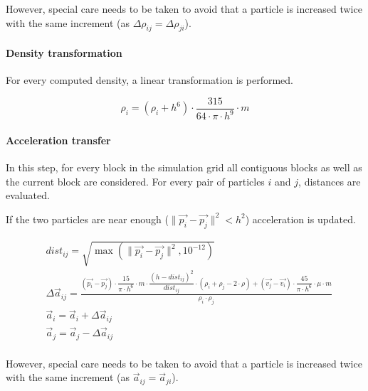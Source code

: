 However, special care needs to be taken to avoid that a particle is increased twice
with the same increment (as $\Delta \rho_{ij} = \Delta \rho_{ji}$).


\paragraph{Density transformation}
For every computed density, a linear transformation is performed.

\[
\rho_i = (\rho_i + h^6) \cdot \frac{315}{64 \cdot \pi \cdot h^9} \cdot m
\]

\paragraph{Acceleration transfer}
In this step, for every block in the simulation grid all contiguous blocks as
well as the current block are considered. For every pair of particles $i$ and
$j$, distances are evaluated.

If the two particles are near enough
($\|\vec{p_i} - \vec{p_j}\|^2 < h^2$) 
acceleration is updated.

\[
\begin{split}
& dist_{ij} = \sqrt{\max(\|\vec{p_i} - \vec{p_j}\|^2, 10^{-12})} \\
& \Delta \vec{a}_{ij} = 
  \frac{
    (\vec{p_i} - \vec{p_j}) \cdot \dfrac{15}{\pi \cdot h^6} \cdot m \cdot 
    \dfrac{(h - dist_{ij})^2}{dist_{ij}} \cdot (\rho_i + \rho_j - 2 \cdot \rho) +
    (\vec{v_j} - \vec{v_i}) \cdot \dfrac{45}{\pi \cdot h^6} \cdot \mu \cdot m
  }{
    \rho_i \cdot \rho_j    
  } \\
& \vec{a}_i = \vec{a}_i + \Delta \vec{a}_{ij}\\
& \vec{a}_j = \vec{a}_j - \Delta \vec{a}_{ij}\\
\end{split}
\]

However, special care needs to be taken to avoid that a particle is increased twice
with the same increment (as $\vec{a}_{ij} = \vec{a}_{ji}$).
